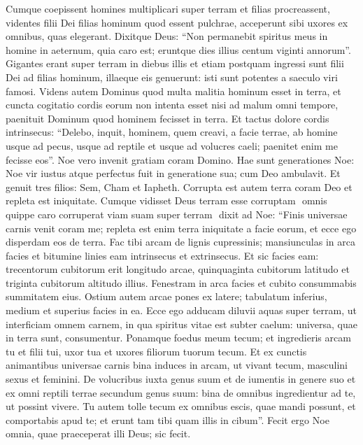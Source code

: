 \begin{biblechapter}  
\verse Cumque coepissent homines multiplicari super terram et filias procreassent, 
\verse videntes filii Dei filias hominum quod essent pulchrae, acceperunt sibi uxores ex omnibus, quas elegerant. 
\verse Dixitque Deus: “Non permanebit spiritus meus in homine in aeternum, quia caro est; eruntque dies illius centum viginti annorum”. 
\verse Gigantes erant super terram in diebus illis et etiam postquam ingressi sunt filii Dei ad filias hominum, illaeque eis genuerunt: isti sunt potentes a saeculo viri famosi. 
\verse Videns autem Dominus quod multa malitia hominum esset in terra, et cuncta cogitatio cordis eorum non intenta esset nisi ad malum omni tempore, 
\verse paenituit Dominum quod hominem fecisset in terra. Et tactus dolore cordis intrinsecus: 
\verse “Delebo, inquit, hominem, quem creavi, a facie terrae, ab homine usque ad pecus, usque ad reptile et usque ad volucres caeli; paenitet enim me fecisse eos”. 
\verse Noe vero invenit gratiam coram Domino. 
\verse Hae sunt generationes Noe: Noe vir iustus atque perfectus fuit in generatione sua; cum Deo ambulavit. 
\verse Et genuit tres filios: Sem, Cham et Iapheth. 
\verse Corrupta est autem terra coram Deo et repleta est iniquitate. 
\verse Cumque vidisset Deus terram esse corruptam ­ omnis quippe caro corruperat viam suam super terram ­ 
\verse dixit ad Noe: “Finis universae carnis venit coram me; repleta est enim terra iniquitate a facie eorum, et ecce ego disperdam eos de terra. 
\verse Fac tibi arcam de lignis cupressinis; mansiunculas in arca facies et bitumine linies eam intrinsecus et extrinsecus. 
\verse Et sic facies eam: trecentorum cubitorum erit longitudo arcae, quinquaginta cubitorum latitudo et triginta cubitorum altitudo illius. 
\verse Fenestram in arca facies et cubito consummabis summitatem eius. Ostium autem arcae pones ex latere; tabulatum inferius, medium et superius facies in ea. 
\verse Ecce ego adducam diluvii aquas super terram, ut interficiam omnem carnem, in qua spiritus vitae est subter caelum: universa, quae in terra sunt, consumentur. 
\verse Ponamque foedus meum tecum; et ingredieris arcam tu et filii tui, uxor tua et uxores filiorum tuorum tecum. 
\verse Et ex cunctis animantibus universae carnis bina induces in arcam, ut vivant tecum, masculini sexus et feminini.  
\verse De volucribus iuxta genus suum et de iumentis in genere suo et ex omni reptili terrae secundum genus suum: bina de omnibus ingredientur ad te, ut possint vivere. 
\verse Tu autem tolle tecum ex omnibus escis, quae mandi possunt, et comportabis apud te; et erunt tam tibi quam illis in cibum”. 
\verse Fecit ergo Noe omnia, quae praeceperat illi Deus; sic fecit. 
\end{biblechapter}

